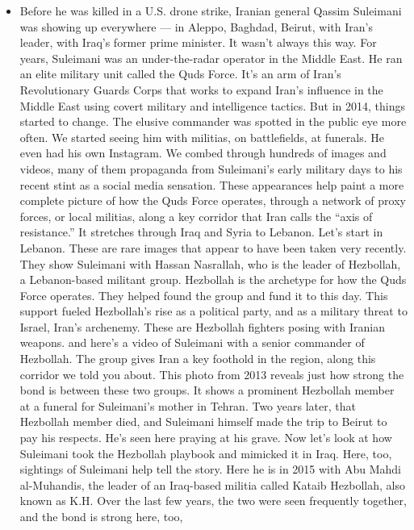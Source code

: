 \begin{itemize}
\tightlist
\item
  Before he was killed in a U.S. drone strike, Iranian general Qassim
  Suleimani was showing up everywhere --- in Aleppo, Baghdad, Beirut,
  with Iran's leader, with Iraq's former prime minister. It wasn't
  always this way. For years, Suleimani was an under-the-radar operator
  in the Middle East. He ran an elite military unit called the Quds
  Force. It's an arm of Iran's Revolutionary Guards Corps that works to
  expand Iran's influence in the Middle East using covert military and
  intelligence tactics. But in 2014, things started to change. The
  elusive commander was spotted in the public eye more often. We started
  seeing him with militias, on battlefields, at funerals. He even had
  his own Instagram. We combed through hundreds of images and videos,
  many of them propaganda from Suleimani's early military days to his
  recent stint as a social media sensation. These appearances help paint
  a more complete picture of how the Quds Force operates, through a
  network of proxy forces, or local militias, along a key corridor that
  Iran calls the ``axis of resistance.'' It stretches through Iraq and
  Syria to Lebanon. Let's start in Lebanon. These are rare images that
  appear to have been taken very recently. They show Suleimani with
  Hassan Nasrallah, who is the leader of Hezbollah, a Lebanon-based
  militant group. Hezbollah is the archetype for how the Quds Force
  operates. They helped found the group and fund it to this day. This
  support fueled Hezbollah's rise as a political party, and as a
  military threat to Israel, Iran's archenemy. These are Hezbollah
  fighters posing with Iranian weapons. and here's a video of Suleimani
  with a senior commander of Hezbollah. The group gives Iran a key
  foothold in the region, along this corridor we told you about. This
  photo from 2013 reveals just how strong the bond is between these two
  groups. It shows a prominent Hezbollah member at a funeral for
  Suleimani's mother in Tehran. Two years later, that Hezbollah member
  died, and Suleimani himself made the trip to Beirut to pay his
  respects. He's seen here praying at his grave. Now let's look at how
  Suleimani took the Hezbollah playbook and mimicked it in Iraq. Here,
  too, sightings of Suleimani help tell the story. Here he is in 2015
  with Abu Mahdi al-Muhandis, the leader of an Iraq-based militia called
  Kataib Hezbollah, also known as K.H. Over the last few years, the two
  were seen frequently together, and the bond is strong here, too,

\end{itemize}
